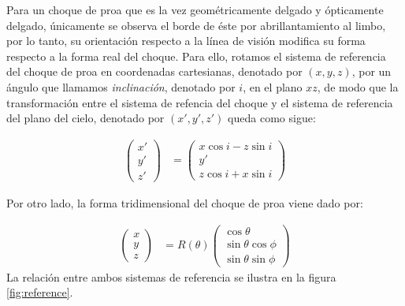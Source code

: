 Para un choque de proa que es la vez geométricamente delgado y
ópticamente delgado, únicamente se observa el borde de éste por
abrillantamiento al limbo, por lo tanto, su orientación respecto a
la línea de visión modifica su forma respecto a la forma real del
choque. Para ello, rotamos el sistema de referencia del choque de proa
en coordenadas cartesianas, denotado por $(x, y, z)$, por un ángulo
que llamamos \textit{inclinación}, denotado por $i$, en el plano $xz$,
de modo que la transformación entre el sistema de refencia del choque
y el sistema de referencia del plano del cielo, denotado por
$(x', y', z')$ queda como sigue:

\begin{align}
  \left(
  \begin{array}{c}
    x' \\ y' \\ z'
  \end{array}
  \right) &=
  \left(
  \begin{array}{c}
    x\cos i - z\sin i \\ y' \\ z\cos i + x\sin i
  \end{array}
  \right)
  \label{eq:rotation}
\end{align}

Por otro lado, la forma tridimensional del choque de proa viene dado por:

\begin{align}
  \left(
  \begin{array}{c}
    x \\ y \\ z
  \end{array}
  \right) &=
            R(\theta)\left(
            \begin{array}{c}
              \cos\theta \\
              \sin\theta\cos\phi \\
              \sin\theta\sin\phi
            \end{array}
            \right)
\end{align}
La relación entre ambos sistemas de referencia se ilustra en la figura
\ref{fig:reference}.

